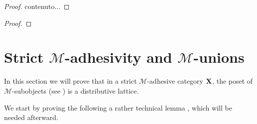 \begin{definition}
\end{definition}

\begin{example}
\end{example}

\begin{example}
\end{example}

\begin{proposition}
\end{proposition}
\begin{proof}
	contenuto... \qedhere 
\end{proof}
\begin{lemma}
\end{lemma}
\begin{proof}
	\qedhere 
\end{proof}

\begin{corollary}
\end{corollary}

\begin{corollary}
\end{corollary}

\section{Strict $\mathcal{M}$-adhesivity and $\mathcal{M}$-unions} 
 
 In this section we will prove that in a strict $\mathcal{M}$-adhesive category $\textbf {\textup{X}}$, the poset of $\mathcal{M}$-subobjects (see  ) is a distributive lattice.
 
 We start by  proving the following a rather technical lemma \cite{garner2012axioms}, which will be needed afterward.
 
